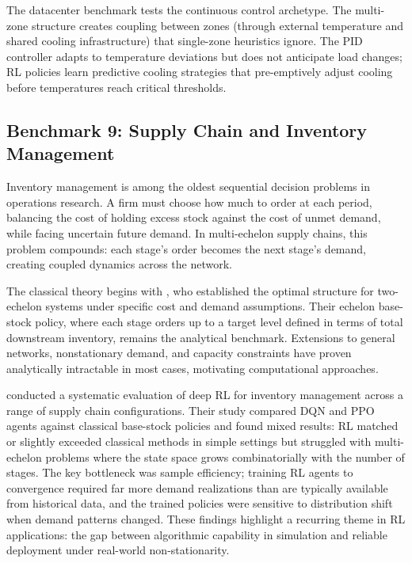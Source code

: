 The datacenter benchmark tests the continuous control archetype. The multi-zone structure creates coupling between zones (through external temperature and shared cooling infrastructure) that single-zone heuristics ignore. The PID controller adapts to temperature deviations but does not anticipate load changes; RL policies learn predictive cooling strategies that pre-emptively adjust cooling before temperatures reach critical thresholds.


\subsection{Benchmark 9: Supply Chain and Inventory Management}
\label{sec:benchmark_inventory}

Inventory management is among the oldest sequential decision problems in operations research. A firm must choose how much to order at each period, balancing the cost of holding excess stock against the cost of unmet demand, while facing uncertain future demand. In multi-echelon supply chains, this problem compounds: each stage's order becomes the next stage's demand, creating coupled dynamics across the network.

The classical theory begins with \citet{ClarkScarf1960inventory}, who established the optimal structure for two-echelon systems under specific cost and demand assumptions. Their echelon base-stock policy, where each stage orders up to a target level defined in terms of total downstream inventory, remains the analytical benchmark. Extensions to general networks, nonstationary demand, and capacity constraints have proven analytically intractable in most cases, motivating computational approaches.

\citet{Gijsbrechts2022inventory} conducted a systematic evaluation of deep RL for inventory management across a range of supply chain configurations. Their study compared DQN and PPO agents against classical base-stock policies and found mixed results: RL matched or slightly exceeded classical methods in simple settings but struggled with multi-echelon problems where the state space grows combinatorially with the number of stages. The key bottleneck was sample efficiency; training RL agents to convergence required far more demand realizations than are typically available from historical data, and the trained policies were sensitive to distribution shift when demand patterns changed. These findings highlight a recurring theme in RL applications: the gap between algorithmic capability in simulation and reliable deployment under real-world non-stationarity.

